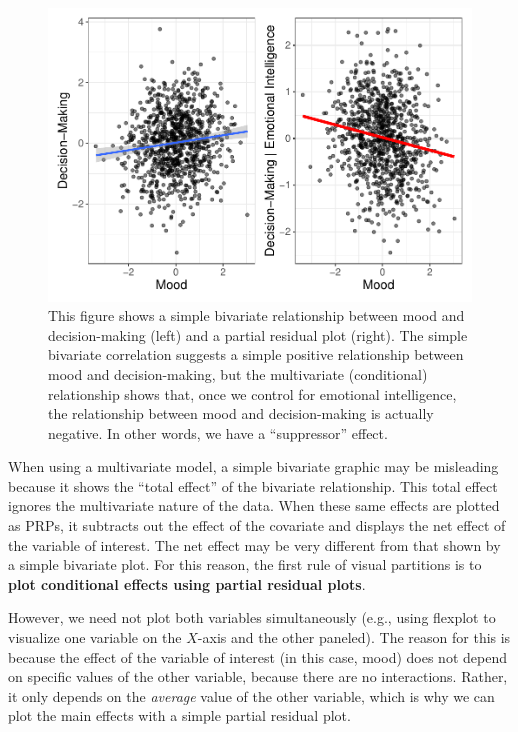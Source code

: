 \documentclass[
  man,floatsintext]{apa6}
\begin{document}
\begin{figure}
\centering
\includegraphics{visual_partitions_files/figure-latex/mainEffects-1.pdf}
\caption{\label{fig:mainEffects}This figure shows a simple bivariate relationship between mood and decision-making (left) and a partial residual plot (right). The simple bivariate correlation suggests a simple positive relationship between mood and decision-making, but the multivariate (conditional) relationship shows that, once we control for emotional intelligence, the relationship between mood and decision-making is actually negative. In other words, we have a ``suppressor'' effect.}
\end{figure}

When using a multivariate model, a simple bivariate graphic may be misleading because it shows the ``total effect'' of the bivariate relationship. This total effect ignores the multivariate nature of the data. When these same effects are plotted as PRPs, it subtracts out the effect of the covariate and displays the net effect of the variable of interest. The net effect may be very different from that shown by a simple bivariate plot. For this reason, the first rule of visual partitions is to \textbf{plot conditional effects using partial residual plots}.

However, we need not plot both variables simultaneously (e.g., using flexplot to visualize one variable on the \(X\)-axis and the other paneled). The reason for this is because the effect of the variable of interest (in this case, mood) does not depend on specific values of the other variable, because there are no interactions. Rather, it only depends on the \emph{average} value of the other variable, which is why we can plot the main effects with a simple partial residual plot.
\end{document}
